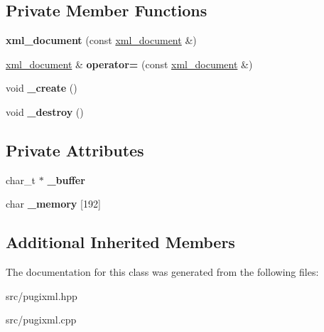 \subsection*{Private Member Functions}
\begin{DoxyCompactItemize}
\item 
\mbox{\label{classpugi_1_1xml__document_a518e0f2e1919b6cb1003b7dec1012ed9}} 
{\bfseries xml\+\_\+document} (const \hyperlink{classpugi_1_1xml__document}{xml\+\_\+document} \&)
\item 
\mbox{\label{classpugi_1_1xml__document_af8e921993cb396b96e1e3c025d21b469}} 
\hyperlink{classpugi_1_1xml__document}{xml\+\_\+document} \& {\bfseries operator=} (const \hyperlink{classpugi_1_1xml__document}{xml\+\_\+document} \&)
\item 
\mbox{\label{classpugi_1_1xml__document_aaa5e251b120dee273b1f46995648fbcb}} 
void {\bfseries \+\_\+create} ()
\item 
\mbox{\label{classpugi_1_1xml__document_a5ae4c55b15c15eaa0640b4969948e0ea}} 
void {\bfseries \+\_\+destroy} ()
\end{DoxyCompactItemize}
\subsection*{Private Attributes}
\begin{DoxyCompactItemize}
\item 
\mbox{\label{classpugi_1_1xml__document_ae0308876ff5f791287aa1199c98ae69b}} 
char\+\_\+t $\ast$ {\bfseries \+\_\+buffer}
\item 
\mbox{\label{classpugi_1_1xml__document_a5b6b5b7c0f0e8f5f772b962fd49fbe1f}} 
char {\bfseries \+\_\+memory} \mbox{[}192\mbox{]}
\end{DoxyCompactItemize}
\subsection*{Additional Inherited Members}


The documentation for this class was generated from the following files\+:\begin{DoxyCompactItemize}
\item 
src/pugixml.\+hpp\item 
src/pugixml.\+cpp\end{DoxyCompactItemize}
